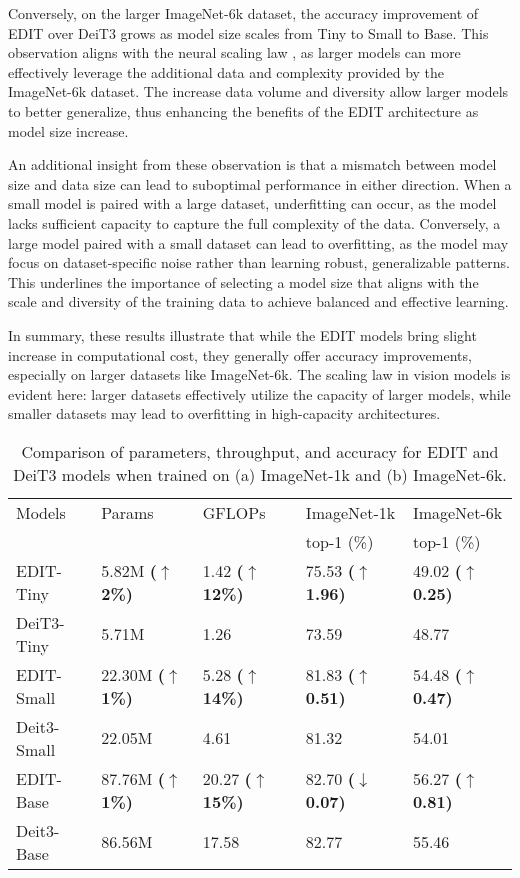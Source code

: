 \documentclass[anon,12pt]{colt2024} %
\begin{document}
Conversely, on the larger ImageNet-6k dataset, the accuracy improvement of EDIT over DeiT3 grows as model size scales from Tiny to Small to Base.
This observation aligns with the neural scaling law \cite{Zhai_2022_CVPR,kaplan2020scaling}, as larger models can more effectively leverage the additional data and complexity provided by the ImageNet-6k dataset.
The increase data volume and diversity allow larger models to better generalize, thus enhancing the benefits of the EDIT architecture as model size increase.

An additional insight from these observation is that a mismatch between model size and data size can lead to suboptimal performance in either direction.
When a small model is paired with a large dataset, underfitting can occur, as the model lacks sufficient capacity to capture the full complexity of the data.
Conversely, a large model paired with a small dataset can lead to overfitting, as the model may focus on dataset-specific noise rather than learning robust, generalizable patterns. This underlines the importance of selecting a model size that aligns with the scale and diversity of the training data to achieve balanced and effective learning.

In summary, these results illustrate that while the EDIT models bring slight increase in computational cost, they generally offer accuracy improvements, especially on larger datasets like ImageNet-6k.
The scaling law in vision models is evident here: larger datasets effectively utilize the capacity of larger models, while smaller datasets may lead to overfitting in high-capacity architectures.


\begin{table} [h!]
  \centering
  \begin{tabular}{l|llll}
    \hline
    Models & Params & GFLOPs & ImageNet-1k  & ImageNet-6k  \\
     &  &  & top-1 (\%) & top-1 (\%) \\
    \hline
    EDIT-Tiny & 5.82M \small\textbf{($\uparrow$2\%)} & 1.42 \small\textbf{($\uparrow$12\%)} & 75.53 \small\textbf{($\uparrow$1.96)} & 49.02 \small\textbf{($\uparrow$0.25)} \\
    DeiT3-Tiny & 5.71M & 1.26 & 73.59 & 48.77 \\
    \hline
    EDIT-Small & 22.30M \small\textbf{($\uparrow$1\%)} & 5.28 \small\textbf{($\uparrow$14\%)} & 81.83 \small\textbf{($\uparrow$0.51)} & 54.48 \small\textbf{($\uparrow$0.47)} \\
    Deit3-Small & 22.05M & 4.61 & 81.32 & 54.01 \\
    \hline
    EDIT-Base & 87.76M \small\textbf{($\uparrow$1\%)} & 20.27 \small\textbf{($\uparrow$15\%)} & 82.70 \small\textbf{($\downarrow$0.07)} & 56.27 \small\textbf{($\uparrow$0.81)} \\
    Deit3-Base & 86.56M & 17.58 & 82.77 & 55.46 \\
    \hline
  \end{tabular}
  \caption{Comparison of parameters, throughput, and accuracy for EDIT and DeiT3 models when trained on (a) ImageNet-1k and (b) ImageNet-6k.}
  \label{tab:comparison-edit-deit3}
\end{table}
\end{document}
